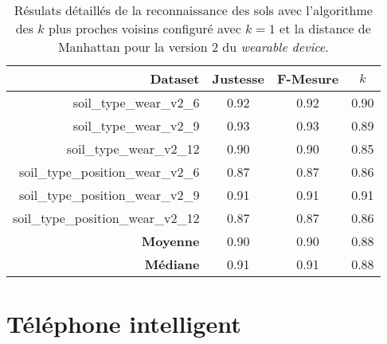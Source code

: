 \begin{table}[H]\renewcommand{\arraystretch}{0.5}
	\centering
	\caption{Résulats détaillés de la reconnaissance des sols avec l'algorithme des $k$ plus proches voisins configuré avec $k=1$ et la distance de Manhattan pour la version 2 du \textit{wearable device}.}
	\label{tab:tab:knn-dM-wear-v2}
	\begin{tabular}{@{}rccc@{}}
		\toprule
			\textbf{Dataset} & \textbf{Justesse} & \textbf{F-Mesure} & \textbf{$k$} \\
		\midrule
			soil\_type\_wear\_v2\_6 & 0.92 & 0.92 & 0.90 \\
			soil\_type\_wear\_v2\_9 & 0.93 & 0.93 & 0.89 \\
			soil\_type\_wear\_v2\_12 & 0.90 & 0.90 & 0.85 \\
			soil\_type\_position\_wear\_v2\_6 & 0.87 & 0.87 & 0.86 \\
			soil\_type\_position\_wear\_v2\_9 & 0.91 & 0.91 & 0.91 \\
			soil\_type\_position\_wear\_v2\_12 & 0.87 & 0.87 & 0.86 \\
			\textbf{Moyenne} & 0.90 & 0.90 & 0.88 \\
			\textbf{Médiane} & 0.91 & 0.91 & 0.88 \\
		\bottomrule
	\end{tabular}
\end{table}

\section{Téléphone intelligent}

